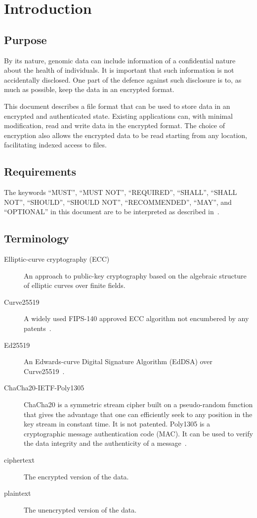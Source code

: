 \section{Introduction}
\subsection{Purpose}
By its nature, genomic data can include information of a confidential nature about the health of individuals.
%
It is important that such information is not accidentally disclosed.
%
One part of the defence against such disclosure is to, as much as possible, keep the data in an encrypted format.
%

This document describes a file format that can be used to store data in an encrypted and authenticated state.
%
Existing applications can, with minimal modification, read and write data in the encrypted format.
%
The choice of encryption also allows the encrypted data to be read starting from any location, facilitating indexed access to files.

\subsection{Requirements}
The keywords ``MUST'', ``MUST NOT'', ``REQUIRED'', ``SHALL'', ``SHALL NOT'', ``SHOULD'', ``SHOULD NOT'', ``RECOMMENDED'', ``MAY'', and ``OPTIONAL'' in this document are to be interpreted as described in~\cite{RFC2119}.

\subsection{Terminology}
%
\begin{description}
\item[Elliptic-curve cryptography (ECC)] %
  An approach to public-key cryptography based on the algebraic structure of elliptic curves over finite fields.
\item[Curve25519] %
  A widely used FIPS-140 approved ECC algorithm not encumbered by any patents~\cite{RFC7748}.
\item[Ed25519] %
  An Edwards-curve Digital Signature Algorithm (EdDSA) over Curve25519~\cite{RFC8032}.
\item[ChaCha20-IETF-Poly1305] %
  ChaCha20 is a symmetric stream cipher built on a pseudo-random function that gives the advantage that one can efficiently seek to any position in the key stream in constant time.
  It is not patented.
  Poly1305 is a cryptographic message authentication code (MAC).
  It can be used to verify the data integrity and the authenticity of a message~\cite{RFC8439}.
\item[ciphertext] %
  The encrypted version of the data.
\item[plaintext] %
  The unencrypted version of the data.
\end{description}
